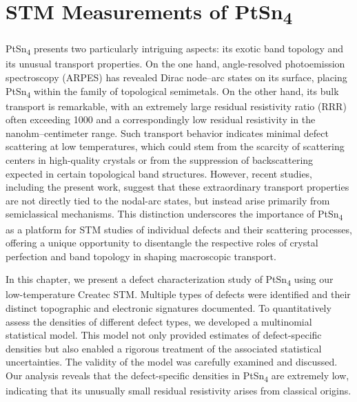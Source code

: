 \chapter{STM Measurements of PtSn\textsubscript{4}}
PtSn\textsubscript{4} presents two particularly intriguing aspects: its exotic band topology and its unusual transport properties. On the one hand, angle-resolved photoemission spectroscopy (ARPES) has revealed Dirac node–arc states on its surface, placing PtSn\textsubscript{4} within the family of topological semimetals\cite{wuDiracNodeArcs2016}. On the other hand, its bulk transport is remarkable, with an extremely large residual resistivity ratio (RRR) often exceeding 1000 and a correspondingly low residual resistivity in the nanohm–centimeter range\cite{munMagneticFieldEffects2012, perevalovaFeaturesElectronicTransport2022, diazSemiclassicalOriginExtreme2024}. Such transport behavior indicates minimal defect scattering at low temperatures, which could stem from the scarcity of scattering centers in high-quality crystals or from the suppression of backscattering expected in certain topological band structures\cite{roushanTopologicalSurfaceStates2009, kimRobustProtectionBackscattering2014, ivanovAbsenceBackscatteringFermiarc2024}. However, recent studies, including the present work, suggest that these extraordinary transport properties are not directly tied to the nodal-arc states, but instead arise primarily from semiclassical mechanisms\cite{diazSemiclassicalOriginExtreme2024}. This distinction underscores the importance of PtSn\textsubscript{4} as a platform for \ac{STM} studies of individual defects and their scattering processes, offering a unique opportunity to disentangle the respective roles of crystal perfection and band topology in shaping macroscopic transport.

In this chapter, we present a defect characterization study of PtSn\textsubscript{4} using our low-temperature Createc \ac{STM}. Multiple types of defects were identified and their distinct topographic and electronic signatures documented. To quantitatively assess the densities of different defect types, we developed a multinomial statistical model. This model not only provided estimates of defect-specific densities but also enabled a rigorous treatment of the associated statistical uncertainties. The validity of the model was carefully examined and discussed. Our analysis reveals that the defect-specific densities in PtSn\textsubscript{4} are extremely low, indicating that its unusually small residual resistivity arises from classical origins.

